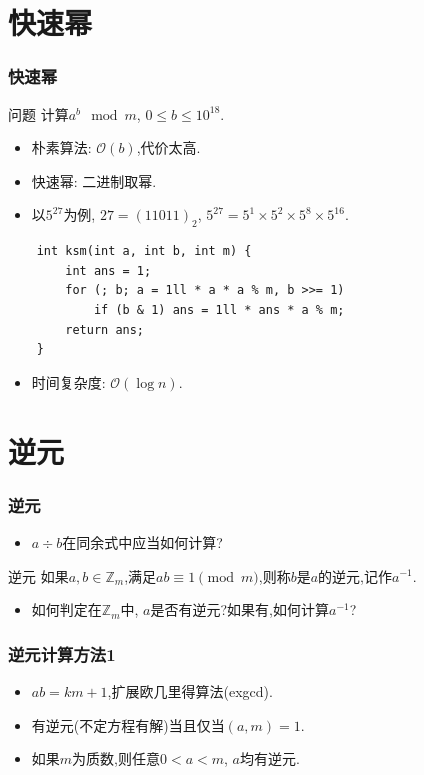 \documentclass{beamer}
\newcommand{\pau}{}
\begin{document}
\section{快速幂}
\begin{frame}[fragile]
    \frametitle{快速幂}
    \begin{block}{问题}
        计算$a^b\mod m$, $0\leqslant b\leqslant10^{18}$.
    \end{block} \pau
    \begin{itemize}
        \item 朴素算法: $\mathcal{O}(b)$,代价太高. \pau
        \item 快速幂: 二进制取幂. \pau
        \item 以$5^{27}$为例, $27=(11011)_2$, $5^{27}=5^1\times5^2\times5^8\times5^{16}$. 
    \end{itemize}\pau
    \begin{verbatim}
    int ksm(int a, int b, int m) {
        int ans = 1;
        for (; b; a = 1ll * a * a % m, b >>= 1)
            if (b & 1) ans = 1ll * ans * a % m;
        return ans;
    }
    \end{verbatim}
    \pau\begin{itemize}
        \item 时间复杂度: $\mathcal{O}(\log n)$.
    \end{itemize}
\end{frame}

\section{逆元}
\begin{frame}[fragile]
    \frametitle{逆元}
    \begin{itemize}
        \item $a\div b$在同余式中应当如何计算?
    \end{itemize}\pau
    \begin{block}{逆元}
        如果$a,b\in\mathbb{Z}_m$,满足$ab\equiv1\pmod m$,则称$b$是$a$的逆元,记作$a^{-1}$.
    \end{block}\pau
    \begin{itemize}
        \item 如何判定在$\mathbb{Z}_m$中, $a$是否有逆元?如果有,如何计算$a^{-1}$?
    \end{itemize}
\end{frame}

\begin{frame}[fragile]
    \frametitle{逆元计算方法1}
    \begin{itemize}
        \item $ab=km+1$,扩展欧几里得算法(exgcd). \pau
        \item 有逆元(不定方程有解)当且仅当$(a,m)=1$. \pau
        \item 如果$m$为质数,则任意$0<a<m$, $a$均有逆元.
    \end{itemize}
\end{frame}
\end{document}
